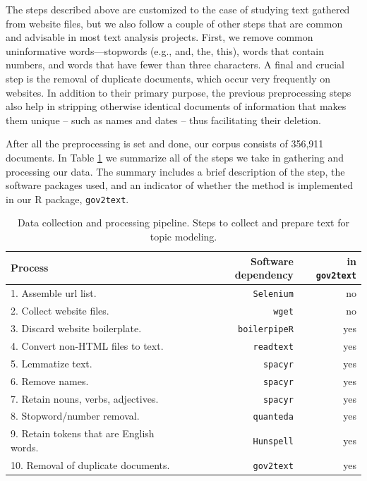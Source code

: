 \documentclass[11pt]{article}
\begin{document}
The steps described above are customized to the case of studying text gathered from website files, but we also follow a couple of other steps that are common and advisable in most text analysis projects. First, we remove common uninformative words---stopwords (e.g., and, the, this), words that contain numbers, and words that have fewer than three characters. A final and crucial step is the removal of duplicate documents, which occur very frequently on websites. In addition to their primary purpose, the previous preprocessing steps also help in stripping otherwise identical documents of information that makes them unique -- such as names and dates -- thus facilitating their deletion. %

After all the preprocessing is set and done, our corpus consists of 356,911 documents.  In Table \ref{tab:list} we summarize all of the steps we take in gathering and processing our data. The summary includes a brief description of the step, the software packages used, and an indicator of whether the method is implemented in our R package, \texttt{gov2text}. 

\begin{table}[ht]
    \centering
    \begin{tabular}{lrr}
        \hline
        Process & Software dependency & in \texttt{gov2text} \\
        \hline
        1. Assemble url list. & \texttt{Selenium} & no \\
        2. Collect website files. & \texttt{wget} & no \\
        3. Discard website boilerplate. & \texttt{boilerpipeR} \citep{boilerpipeR} & yes \\
        4. Convert non-HTML files to text. & \texttt{readtext} \citep{readtext} & yes \\
        5. Lemmatize text. & \texttt{spacyr} \citep{spacyr}& yes \\
        6. Remove names. & \texttt{spacyr} & yes \\
        7. Retain nouns, verbs, adjectives. & \texttt{spacyr} & yes \\
        8. Stopword/number removal. & \texttt{quanteda} \citep{quanteda} & yes \\ 
        9. Retain tokens that are English words. & \texttt{Hunspell} \citep{hunspell} & yes \\
        10. Removal of duplicate documents. & \texttt{gov2text} & yes \\
        \hline
    \end{tabular}
    \caption{\label{tab:list} Data collection and processing pipeline. Steps to collect and prepare text for topic modeling.} 
\end{table}
\end{document}
